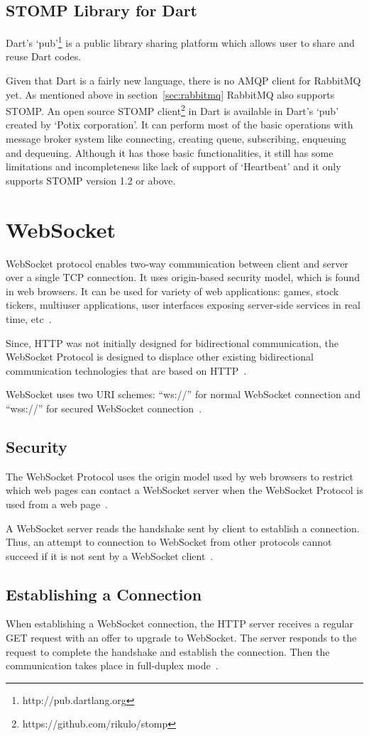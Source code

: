   \subsection{STOMP Library for Dart}
  \label{subsec:stompForDart}
  Dart's ‘pub’\footnote{http://pub.dartlang.org} is a public library sharing platform which allows user to share and reuse Dart codes.

  Given that Dart is a fairly new language, there is no AMQP client for RabbitMQ yet. As mentioned above in section~\ref{sec:rabbitmq} RabbitMQ also supports STOMP. An open source STOMP client\footnote{https://github.com/rikulo/stomp} in Dart is available in Dart's ‘pub’ created by ‘Potix corporation’. It can perform most of the basic operations with message broker system like connecting, creating queue, subscribing, enqueuing and dequeuing. Although it has those basic functionalities, it still has some limitations and incompleteness like lack of support of ‘Heartbeat’ and it only supports STOMP version 1.2 or above.


\section{WebSocket}
\label{sec:websocket}
  WebSocket protocol enables two-way communication between client and server over a single TCP connection. It uses origin-based security model, which is found in web browsers. It can be used for variety of web applications: games, stock tickers, multiuser applications, user interfaces exposing server-side services in real time, etc~\cite{rfc6455}.

  Since, HTTP was not initially designed for bidirectional communication, the WebSocket Protocol is designed to displace other existing bidirectional communication technologies that are based on HTTP~\cite{rfc6455}.

  WebSocket uses two URI schemes: “ws://” for normal WebSocket connection and “wss://” for secured WebSocket connection~\cite{rfc6455}.

\subsection{Security}
  The WebSocket Protocol uses the origin model used by web browsers to restrict which web pages can contact a WebSocket server when the WebSocket Protocol is used from a web page~\cite{rfc6455}.

   A WebSocket server reads the handshake sent by client to establish a connection. Thus, an attempt to connection to WebSocket from other protocols cannot succeed if it is not sent by a WebSocket client~\cite{rfc6455}.

\subsection{Establishing a Connection}
  When establishing a WebSocket connection, the HTTP server receives a regular GET request with an offer to upgrade to WebSocket. The server responds to the request to complete the handshake and establish the connection. Then the communication takes place in full-duplex mode~\cite{rfc6455}.
